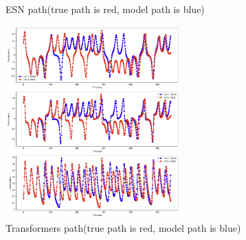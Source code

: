 \documentclass[11pt]{article}
\begin{document}
\begin{figure}
\begin{minipage}[b]{0.49\textwidth}
        \caption{ESN path(true path is red, model path is blue)}
        \label{fig:echo_path}
    \end{minipage}
\end{figure}
\begin{figure}
    \centering
    \includegraphics[width=0.6\textwidth]{transformers_path.jpeg}
    \caption{Transformers path(true path is red, model path is blue)}
    \label{fig:transformers_path}
\end{figure}
\end{document}
